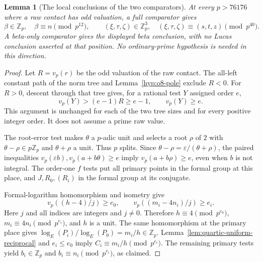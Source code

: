 \documentclass[11pt]{article}
\newtheorem{lemma}[theorem]{Lemma}
\theoremstyle{definition}
\theoremstyle{remark}
\newcommand{\Z}{\mathbb Z}
\begin{document}
\begin{lemma}[The local conclusions of the two comparators]
\label{lem:quartic-selective-local}
At every $p>76176$ where a raw contact has odd valuation, a full
comparator gives
\[
 \beta\in\Z_p,\quad \beta\equiv n\pmod {p^{12}},\qquad
 (\xi,\tau,\zeta)\in\Z_p^3,\quad
 (\xi,\tau,\zeta)\equiv(s,t,z)\pmod {p^{40}}.
\]
A beta-only comparator gives the displayed beta conclusion, with no
Lucas conclusion asserted at that position.
No ordinary-prime hypothesis is needed in this direction.
\end{lemma}
\begin{proof}
Let $R=v_p(r)$ be the odd valuation of the raw contact. The all-left
constant path of the norm tree and Lemma~\ref{hyp:o8-pole} exclude
$R<0$. For $R>0$, descent through that tree gives, for a rational test
$Y$ assigned order $e$,
\[
 v_p(Y)>(e-1)R\ge e-1,\qquad v_p(Y)\ge e.
\]
This argument is unchanged for each of the two tree sizes and for
every positive integer order. It does not assume a prime raw value.

The root-error test makes $\theta$ a $p$-adic unit and selects a root
$\rho$ of $2$ with $\theta-\rho\in p\Z_p$ and $\theta+\rho$ a unit.
Thus $p$ splits. Since
$\theta-\rho=\varepsilon/(\theta+\rho)$, the paired inequalities
$v_p(\varepsilon b),v_p(a+b\theta)\ge e$ imply
$v_p(a+b\rho)\ge e$, even when $b$ is not integral.
The order-one $f$ tests put all primary points in the formal group at
this place, and $J,R_0,(R_i)$ in the formal group at its conjugate.

Formal-logarithm homomorphism and isometry
\cite[IV.6.4 and VII.2.1--2.2]{silverman} give
\[
 v_p((h-4)/j)\ge e_0,\qquad
 v_p((m_i-4n_i)/j)\ge e_i.
\]
Here $j$ and all indices are integers and $j\ne0$. Therefore
$h\equiv4\pmod {p^{e_0}}$, $m_i\equiv4n_i\pmod {p^{e_i}}$,
and $h$ is a unit. The same homomorphism at the primary place gives
$\log_E(P_i)/\log_E(P_0)=m_i/h\in\Z_p$.
Lemma~\ref{lem:quartic-uniform-reciprocal} and $e_i\le e_0$ imply
$C_i\equiv m_i/h\pmod {p^{e_i}}$. The remaining primary tests yield
$b_i\in\Z_p$ and $b_i\equiv n_i\pmod {p^{e_i}}$, as claimed.
\end{proof}
\end{document}
